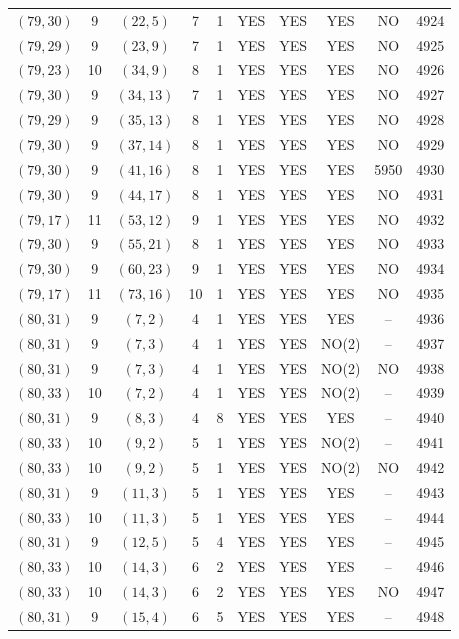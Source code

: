\begin{longtable}{|c|c|c|c|c|c|c|c|c|c|}
$(79, 30)$ & 9 & $(22, 5)$ & 7 & 1 & YES & YES & YES & NO & 4924\\
$(79, 29)$ & 9 & $(23, 9)$ & 7 & 1 & YES & YES & YES & NO & 4925\\
$(79, 23)$ & 10 & $(34, 9)$ & 8 & 1 & YES & YES & YES & NO & 4926\\
$(79, 30)$ & 9 & $(34, 13)$ & 7 & 1 & YES & YES & YES & NO & 4927\\
$(79, 29)$ & 9 & $(35, 13)$ & 8 & 1 & YES & YES & YES & NO & 4928\\
$(79, 30)$ & 9 & $(37, 14)$ & 8 & 1 & YES & YES & YES & NO & 4929\\
$(79, 30)$ & 9 & $(41, 16)$ & 8 & 1 & YES & YES & YES & 5950 & 4930\\
$(79, 30)$ & 9 & $(44, 17)$ & 8 & 1 & YES & YES & YES & NO & 4931\\
$(79, 17)$ & 11 & $(53, 12)$ & 9 & 1 & YES & YES & YES & NO & 4932\\
$(79, 30)$ & 9 & $(55, 21)$ & 8 & 1 & YES & YES & YES & NO & 4933\\
$(79, 30)$ & 9 & $(60, 23)$ & 9 & 1 & YES & YES & YES & NO & 4934\\
$(79, 17)$ & 11 & $(73, 16)$ & 10 & 1 & YES & YES & YES & NO & 4935\\
$(80, 31)$ & 9 & $(7, 2)$ & 4 & 1 & YES & YES & YES & -- & 4936\\
$(80, 31)$ & 9 & $(7, 3)$ & 4 & 1 & YES & YES & NO(2) & -- & 4937\\
$(80, 31)$ & 9 & $(7, 3)$ & 4 & 1 & YES & YES & NO(2) & NO & 4938\\
$(80, 33)$ & 10 & $(7, 2)$ & 4 & 1 & YES & YES & NO(2) & -- & 4939\\
$(80, 31)$ & 9 & $(8, 3)$ & 4 & 8 & YES & YES & YES & -- & 4940\\
$(80, 33)$ & 10 & $(9, 2)$ & 5 & 1 & YES & YES & NO(2) & -- & 4941\\
$(80, 33)$ & 10 & $(9, 2)$ & 5 & 1 & YES & YES & NO(2) & NO & 4942\\
$(80, 31)$ & 9 & $(11, 3)$ & 5 & 1 & YES & YES & YES & -- & 4943\\
$(80, 33)$ & 10 & $(11, 3)$ & 5 & 1 & YES & YES & YES & -- & 4944\\
$(80, 31)$ & 9 & $(12, 5)$ & 5 & 4 & YES & YES & YES & -- & 4945\\
$(80, 33)$ & 10 & $(14, 3)$ & 6 & 2 & YES & YES & YES & -- & 4946\\
$(80, 33)$ & 10 & $(14, 3)$ & 6 & 2 & YES & YES & YES & NO & 4947\\
$(80, 31)$ & 9 & $(15, 4)$ & 6 & 5 & YES & YES & YES & -- & 4948\\

\end{longtable}
